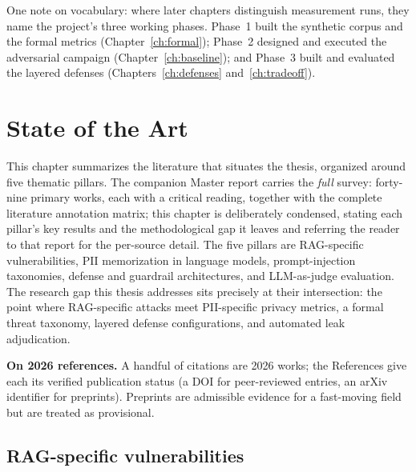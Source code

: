 \documentclass[12pt,a4paper]{report}
\begin{document}
One note on vocabulary: where later chapters distinguish measurement runs, they name the
project's three working phases. Phase~1 built the synthetic corpus and the formal metrics
(Chapter~\ref{ch:formal}); Phase~2 designed and executed the adversarial campaign
(Chapter~\ref{ch:baseline}); and Phase~3 built and evaluated the layered defenses
(Chapters~\ref{ch:defenses} and~\ref{ch:tradeoff}).


\chapter{State of the Art}
\label{ch:sota}

This chapter summarizes the literature that situates the thesis, organized around five thematic
pillars. The companion Master report carries the \emph{full} survey: forty-nine primary works, each
with a critical reading, together with the complete literature annotation matrix; this chapter is
deliberately condensed, stating each pillar's key results and the methodological gap it leaves and
referring the reader to that report for the per-source detail. The five pillars are RAG-specific
vulnerabilities, PII memorization in language models, prompt-injection taxonomies, defense and
guardrail architectures, and LLM-as-judge evaluation. The research gap this thesis addresses sits
precisely at their intersection: the point where RAG-specific attacks meet PII-specific privacy
metrics, a formal threat taxonomy, layered defense configurations, and automated leak adjudication.

\begin{notebox}
\textbf{On 2026 references.} A handful of citations are 2026 works; the References give each its verified
publication status (a DOI for peer-reviewed entries, an arXiv identifier for preprints). Preprints are
admissible evidence for a fast-moving field but are treated as provisional.
\end{notebox}

\section{RAG-specific vulnerabilities}
\label{sec:rag-vuln}
\end{document}
